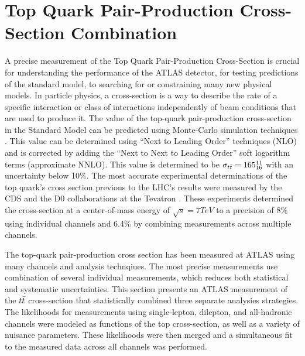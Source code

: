 %
%
%

\section{Top Quark Pair-Production Cross-Section Combination}

A precise measurement of the Top Quark Pair-Production Cross-Section is crucial for understanding the performance of the ATLAS detector, for testing predictions of the standard model, to searching for or constraining many new physical models.
In particle physics, a cross-section is a way to describe the rate of a specific interaction or class of interactions independently of beam conditions that are used to produce it.
The value of the top-quark pair-production cross-section in the Standard Model can be predicted using Monte-Carlo simulation techniques \cite{TOP_XSC_THEORY} \cite{TTBAR_HADRON_COLLIDERS} \cite{THRESHOLD_EXPANSION_XSC}.
This value can be determined using ``Next to Leading Order'' techniques (NLO) and is corrected by adding the ``Next to Next to Leading Order'' soft logarithm terms (approximate NNLO).
This value is determined to be $\sigma_{t\bar{t}} = 165^{11}_{16}$ with an uncertainty below 10\%.
The most accurate experimental determinations of the top quark's cross section previous to the LHC's results were measured by the CDS and the D0 collaborations at the Tevatron \cite{TEVATRON_XSC_LJETS} \cite{TEVATRON_XSC_DILEP}.
These experiments determined the cross-section at a center-of-mass energy of $\sqrt{s} = 7 TeV$ to a precision of 8\% using individual channels and 6.4\% by combining measurements across multiple channels.

The top-quark pair-production cross section has been measured at ATLAS using many channels and analysis technqiues.
The most precise measurements use combination of several individual measurements, which reduces both statistical and systematic uncertainties.
This section presents an ATLAS measurement of the $t\bar{t}$ cross-section that statistically combined three separate analysies strategies.
The likelihoods for measurements using single-lepton, dilepton, and all-hadronic channels were modeled as functions of the top cross-section, as well as a variety of nuisance parameters.
These likelihoods were then merged and a simultaneous fit to the measured data across all channels was performed.

